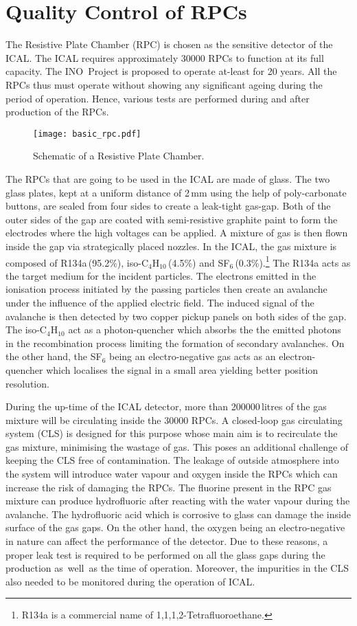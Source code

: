 
\chapter{Quality Control of RPCs}
The Resistive Plate Chamber (RPC) is chosen as the sensitive detector of the
ICAL. The ICAL requires approximately 30000 RPCs to function at its full
capacity. The INO~Project is proposed to operate at-least for 20 years. All
the RPCs thus must operate without showing any significant ageing during the
period of operation. Hence, various tests are performed during and after
production of the RPCs.
\begin{figure}[h]
  \centering
  \texttt{[image: basic\_rpc.pdf]}
  \caption{Schematic of a Resistive Plate Chamber.}
  \label{fig:rpc}
\end{figure}

The RPCs that are going to be used in the ICAL are made of glass. The two glass plates,
kept at a uniform distance of 2\,mm using the help of poly-carbonate buttons,
are sealed from four sides to create a leak-tight gas-gap. Both of the outer
sides of the gap are coated with semi-resistive graphite paint to form the
electrodes where the high voltages can be applied. A mixture of gas is then
flown inside the gap via strategically placed nozzles. In the ICAL, the gas
mixture is composed of R134a\,(95.2\%), iso-C$_4$H$_{10}$\,(4.5\%) and
SF$_6$\,(0.3\%).\footnote{R134a is a commercial name of 1,1,1,2-Tetrafluoroethane.}
The R134a acts as the target medium for the incident particles. The electrons
emitted in the ionisation process initiated by the passing particles then
create an avalanche under the influence of the applied electric field. The induced
signal of the avalanche is then detected by two copper pickup panels on both
sides of the gap. The iso-C$_4$H$_{10}$ act as a photon-quencher which absorbs
the the emitted photons in the recombination process limiting the formation of
secondary avalanches. On the other hand, the SF$_6$ being an electro-negative
gas acts as an electron-quencher which localises the signal in a small area
yielding better position resolution.

During the up-time of the ICAL detector, more than 200000\,litres of the gas
mixture will be circulating inside the 30000 RPCs. A closed-loop gas
circulating system (CLS) is designed for this purpose whose main aim is to
recirculate the gas mixture, minimising the wastage of gas. This poses an
additional challenge of keeping the CLS free of contamination. The leakage of
outside atmosphere into the system will introduce water vapour and oxygen
inside the RPCs which can increase the risk of damaging the
RPCs\cite{rpc_c,rpc_w}. The fluorine present in the RPC gas mixture can
produce hydrofluoric after reacting with the water vapour during the avalanche.
The hydrofluoric acid which is corrosive to glass can damage the inside surface
of the gas gaps. On the other hand, the oxygen being an electro-negative in
nature can affect the performance of the detector. Due to these reasons, a
proper leak test is required to be performed on all the glass gaps during the
production as~well~as the time of operation. Moreover, the impurities in the
CLS also needed to be monitored during the operation of ICAL.

